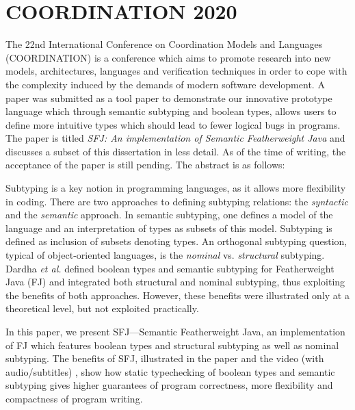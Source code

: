 \documentclass{l4proj}
\begin{document}
\section{COORDINATION 2020}

The 22nd International Conference on Coordination Models and Languages (COORDINATION) is a conference which aims to promote research into new models, architectures, languages and verification techniques in order to cope with the complexity induced by the demands of modern software development.
A paper was submitted as a tool paper to demonstrate our innovative prototype language which through semantic subtyping and boolean types, allows users to define more intuitive types which should lead to fewer logical bugs in programs.
The paper is titled \emph{SFJ: An implementation of Semantic Featherweight Java} and discusses a subset of this dissertation in less detail.
As of the time of writing, the acceptance of the paper is still pending.
The abstract is as follows:

\begin{adjustwidth}{50pt}{50pt}
    Subtyping is a key notion in programming languages, as it allows more flexibility in coding.
    There are two approaches to defining subtyping relations: the \emph{syntactic} and the \emph{semantic} approach.
    In semantic subtyping, one defines a model of the language and an interpretation of types as subsets of this model.
    Subtyping is defined as inclusion of subsets denoting types.
    An orthogonal subtyping question, typical of object-oriented languages, is the \emph{nominal} vs. \emph{structural} subtyping.
    Dardha \emph{et al.} \cite{Dardha2013,Dardha2017} defined boolean types and semantic subtyping for Featherweight Java (FJ) and integrated both structural and nominal subtyping, thus exploiting the benefits of both approaches.
    However, these benefits were illustrated only at a theoretical level, but not exploited practically.

    In this paper, we present SFJ---Semantic Featherweight Java, an implementation of FJ which features boolean types and structural subtyping as well as nominal subtyping.
    The benefits of SFJ, illustrated in the paper and the video (with audio/subtitles) \cite{UD20}, show how static typechecking of boolean types and semantic subtyping gives higher guarantees of program correctness, more flexibility and compactness of program writing.
\end{adjustwidth}


\end{document}

